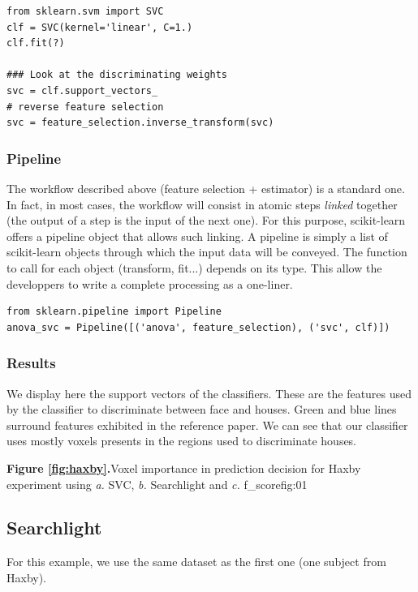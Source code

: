 \documentclass{frontiersSCNS} %
\begin{document}
\begin{lstlisting}
from sklearn.svm import SVC
clf = SVC(kernel='linear', C=1.)
clf.fit(?)

### Look at the discriminating weights
svc = clf.support_vectors_
# reverse feature selection
svc = feature_selection.inverse_transform(svc)
\end{lstlisting}

\subsubsection{Pipeline}

The workflow described above (feature selection + estimator) is a standard one.
In fact, in most cases, the workflow will consist in atomic steps
\textit{linked} together (the output of a step is the input of the next one).
For this purpose, scikit-learn offers a pipeline object that allows such
linking. A pipeline is simply a list of scikit-learn objects through which the
input data will be conveyed. The function to call for each object (transform,
fit...) depends on its type.
This allow the developpers to write a complete processing as a one-liner.

\begin{lstlisting}
from sklearn.pipeline import Pipeline
anova_svc = Pipeline([('anova', feature_selection), ('svc', clf)])
\end{lstlisting}

\subsubsection{Results}

We display here the support vectors of the classifiers. These are the features
used by the classifier to discriminate between face and houses. Green and blue
lines surround features exhibited in the reference paper. We can see that our
classifier uses mostly voxels presents in the regions used to discriminate
houses.

\textbf{Figure \ref{fig:haxby}.}{Voxel importance in prediction decision for Haxby experiment
using \textit{a.} SVC, \textit{b.} Searchlight and \textit{c.} f\_score}{fig:01}

\subsection{Searchlight}
\label{searchlight}
For this example, we use the same dataset as the first one (one subject from
Haxby).
\end{document}
